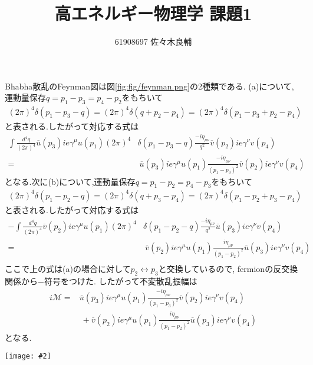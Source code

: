 \documentclass[leqno,uplatex,a4j,11pt,dvipdfmx]{jsarticle}
\makeatletter
\def\fgcaption{\def\@captype{figure}\caption}
\newcommand{\mfig}[3][width=15cm]{
\begin{center}
\texttt{[image: \#2]}
\fgcaption{#3 \label{fig:#2}}
\end{center}
}
\makeatother
\begin{document}
\title{高エネルギー物理学 課題1}
\author{61908697 佐々木良輔}
\date{}
\maketitle
Bhabha散乱のFeynman図は図\ref{fig:fig/feynman.png}の2種類である.
(a)について,運動量保存$q=p_1-p_3=p_4-p_2$をもちいて
\begin{align*}
  (2\pi)^4\delta(p_1-p_3-q)=(2\pi)^4\delta(q+p_2-p_4)=(2\pi)^4\delta(p_1-p_3+p_2-p_4)
\end{align*}
と表される.したがって対応する式は
\begin{align*}
  \int\frac{d^4q}{(2\pi)^4}\overline{u}(p_3)ie\gamma^\mu u(p_1)(2\pi)^4&\delta(p_1-p_3-q)\frac{-i\eta_{\mu\nu}}{q^2}\overline{v}(p_2)ie\gamma^\nu v(p_4)\\
  =&\ \overline{u}(p_3)ie\gamma^\mu u(p_1)\frac{-i\eta_{\mu\nu}}{(p_1-p_3)^2}\overline{v}(p_2)ie\gamma^\nu v(p_4)
\end{align*}
となる.次に(b)について,運動量保存$q=p_1-p_2=p_4-p_3$をもちいて
\begin{align*}
  (2\pi)^4\delta(p_1-p_2-q)=(2\pi)^4\delta(q+p_3-p_4)=(2\pi)^4\delta(p_1-p_2+p_3-p_4)
\end{align*}
と表される.したがって対応する式は
\begin{align*}
  -\int\frac{d^4q}{(2\pi)^4}\overline{v}(p_2)ie\gamma^\mu u(p_1)(2\pi)^4&\delta(p_1-p_2-q)\frac{-i\eta_{\mu\nu}}{q^2}\overline{u}(p_3)ie\gamma^\nu v(p_4)\\
  =&\ \overline{v}(p_2)ie\gamma^\mu u(p_1)\frac{i\eta_{\mu\nu}}{(p_1-p_2)^2}\overline{u}(p_3)ie\gamma^\nu v(p_4)\\
\end{align*}
ここで上の式は(a)の場合に対して$p_2\leftrightarrow p_3$と交換しているので,
fermionの反交換関係から$-$符号をつけた.
したがって不変散乱振幅は
\begin{align*}
  i\mathcal{M}=&\overline{u}(p_3)ie\gamma^\mu u(p_1)\frac{-i\eta_{\mu\nu}}{(p_1-p_3)^2}\overline{v}(p_2)ie\gamma^\nu v(p_4)\\
  &\ +\overline{v}(p_2)ie\gamma^\mu u(p_1)\frac{i\eta_{\mu\nu}}{(p_1-p_2)^2}\overline{u}(p_3)ie\gamma^\nu v(p_4)
\end{align*}
となる.
\mfig[width=12cm]{fig/feynman.png}{Bhabha散乱のFeynman図}

\end{document}
